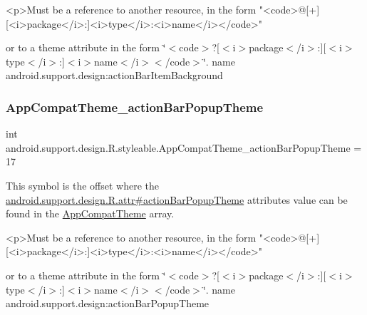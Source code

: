 \begin{DoxyVerb}      <p>Must be a reference to another resource, in the form "<code>@[+][<i>package</i>:]<i>type</i>:<i>name</i></code>"
\end{DoxyVerb}
 or to a theme attribute in the form \char`\"{}$<$code$>$?\mbox{[}$<$i$>$package$<$/i$>$\+:\mbox{]}\mbox{[}$<$i$>$type$<$/i$>$\+:\mbox{]}$<$i$>$name$<$/i$>$$<$/code$>$\char`\"{}.  name android.\+support.\+design\+:action\+Bar\+Item\+Background \mbox{\label{classandroid_1_1support_1_1design_1_1R_1_1styleable_abe6573d781c288c0c9046d1b364bc010}} 
\subsubsection{\texorpdfstring{App\+Compat\+Theme\+\_\+action\+Bar\+Popup\+Theme}{AppCompatTheme\_actionBarPopupTheme}}
{\footnotesize\ttfamily int android.\+support.\+design.\+R.\+styleable.\+App\+Compat\+Theme\+\_\+action\+Bar\+Popup\+Theme = 17\hspace{0.3cm}{\ttfamily [static]}}

This symbol is the offset where the \hyperlink{classandroid_1_1support_1_1design_1_1R_1_1attr_a0f8b2d84f24c78d7da114bc3055a921a}{android.\+support.\+design.\+R.\+attr\#action\+Bar\+Popup\+Theme} attribute\textquotesingle{}s value can be found in the \hyperlink{classandroid_1_1support_1_1design_1_1R_1_1styleable_afb351dc8de20cbd4c89abe360373010c}{App\+Compat\+Theme} array.

\begin{DoxyVerb}      <p>Must be a reference to another resource, in the form "<code>@[+][<i>package</i>:]<i>type</i>:<i>name</i></code>"
\end{DoxyVerb}
 or to a theme attribute in the form \char`\"{}$<$code$>$?\mbox{[}$<$i$>$package$<$/i$>$\+:\mbox{]}\mbox{[}$<$i$>$type$<$/i$>$\+:\mbox{]}$<$i$>$name$<$/i$>$$<$/code$>$\char`\"{}.  name android.\+support.\+design\+:action\+Bar\+Popup\+Theme \mbox{\label{classandroid_1_1support_1_1design_1_1R_1_1styleable_aa3e26576191105ff3f5ba8a1d92c188f}} 
